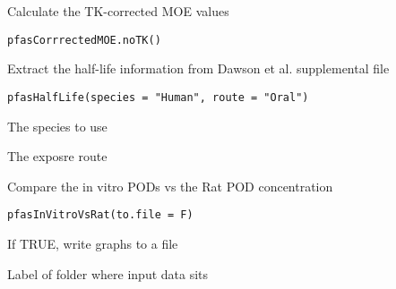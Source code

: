 \documentclass[a4paper]{book}
\begin{document}
%
\begin{Description}\relax
Calculate the TK-corrected MOE values
\end{Description}
%
\begin{Usage}
\begin{verbatim}
pfasCorrrectedMOE.noTK()
\end{verbatim}
\end{Usage}
%
\begin{Description}\relax
Extract the half-life information from Dawson et al. supplemental file
\end{Description}
%
\begin{Usage}
\begin{verbatim}
pfasHalfLife(species = "Human", route = "Oral")
\end{verbatim}
\end{Usage}
%
\begin{Arguments}
\begin{ldescription}
\item[\code{species}] The species to use

\item[\code{route}] The exposre route
\end{ldescription}
\end{Arguments}
%
\begin{Description}\relax
Compare the in vitro PODs vs the Rat POD concentration
\end{Description}
%
\begin{Usage}
\begin{verbatim}
pfasInVitroVsRat(to.file = F)
\end{verbatim}
\end{Usage}
%
\begin{Arguments}
\begin{ldescription}
\item[\code{to.file}] If TRUE, write graphs to a file

\item[\code{data.version}] Label of folder where input data sits
\end{ldescription}
\end{Arguments}
\end{document}
